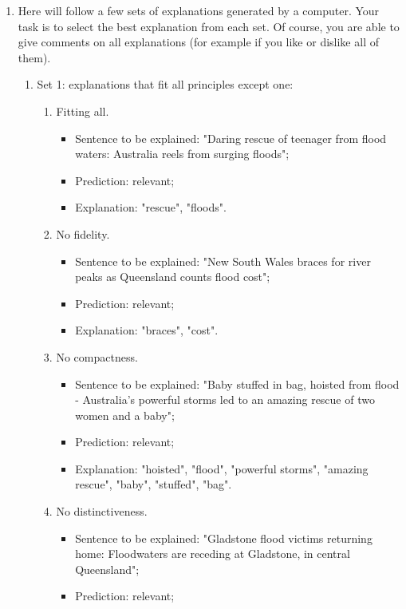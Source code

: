 \begin{enumerate}
    \item Here will follow a few sets of explanations generated by a computer. Your task is to select the best explanation from each set. Of course, you are able to give comments on all explanations (for example if you like or dislike all of them). \begin{enumerate}
        \item Set 1: explanations that fit all principles except one: \begin{enumerate}
            \item Fitting all. \begin{itemize}
                \item Sentence to be explained: "Daring rescue of teenager from flood waters: Australia reels from surging floods";
                \item Prediction: relevant;
                \item Explanation: "rescue", "floods".
            \end{itemize}
            \item No fidelity. \begin{itemize}
                \item Sentence to be explained: "New South Wales braces for river peaks as Queensland counts flood cost";
                \item Prediction: relevant;
                \item Explanation: "braces", "cost".
            \end{itemize}
            \item No compactness. \begin{itemize}
                \item Sentence to be explained: "Baby stuffed in bag, hoisted from flood - Australia's powerful storms led to an amazing rescue of two women and a baby";
                \item Prediction: relevant;
                \item Explanation: "hoisted", "flood", "powerful storms", "amazing rescue", "baby", "stuffed", "bag".
            \end{itemize}
            \item No distinctiveness. \begin{itemize}
                \item Sentence to be explained: "Gladstone flood victims returning home: Floodwaters are receding at Gladstone, in central Queensland";
                \item Prediction: relevant;

\end{itemize}
\end{enumerate}
\end{enumerate}
\end{enumerate}
